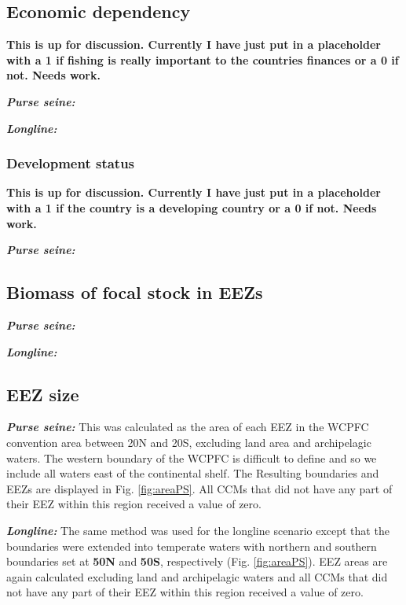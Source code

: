 \documentclass[11pt]{article}
\begin{document}
\subsection*{Economic dependency}
{\bf This is up for discussion. Currently I have just put in a placeholder with a 1 if fishing is really important to the countries finances or a 0 if not. Needs work.}

\noindent\textbf{\emph{Purse seine:}}

\noindent\textbf{\emph{Longline:}}

\subsubsection*{Development status}
{\bf This is up for discussion. Currently I have just put in a placeholder with a 1 if the country is a developing country or a 0 if not. Needs work.}

\noindent\textbf{\emph{Purse seine:}}

\subsection*{Biomass of focal stock in EEZs}
\noindent\textbf{\emph{Purse seine:}}

\noindent\textbf{\emph{Longline:}}

\subsection*{EEZ size}
\noindent\textbf{\emph{Purse seine:}}
This was calculated as the area of each EEZ in the WCPFC convention area between 20\degree N and 20\degree S, excluding land area and archipelagic waters. The western boundary of the WCPFC is difficult to define and so we include all waters east of the continental shelf. The Resulting boundaries and EEZs are displayed in Fig. \ref{fig:areaPS}. All CCMs that did not have any part of their EEZ within this region received a value of zero.

\noindent\textbf{\emph{Longline:}}
The same method was used for the longline scenario except that the boundaries were extended into temperate waters with northern and southern boundaries set at {\bf 50\degree N} and {\bf 50\degree S}, respectively (Fig. \ref{fig:areaPS}). EEZ areas are again calculated excluding land and archipelagic waters and all CCMs that did not have any part of their EEZ within this region received a value of zero.
\end{document}
